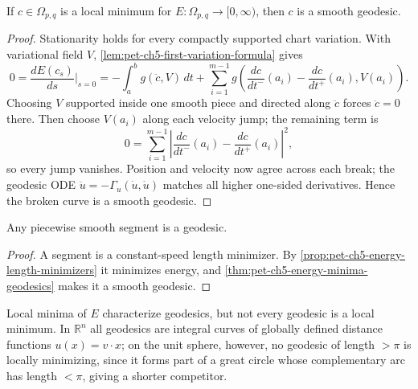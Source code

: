 \begin{theorem}
  \label{thm:pet-ch5-energy-minima-geodesics}


  If $c\in\Omega_{p,q}$ is a local minimum for $E:\Omega_{p,q}\to[0,\infty)$, then
  $c$ is a smooth geodesic.
\end{theorem}
\begin{proof}

  \sketch
  Stationarity holds for every compactly supported chart variation.  With
  variational field $V$, \cref{lem:pet-ch5-first-variation-formula} gives
  \[
    0=\frac{dE(c_s)}{ds}\Big|_{s=0}
    =-\int_a^bg(\ddot c,V)\,dt+\sum_{i=1}^{m-1}g\!\left(\frac{dc}{dt^-}(a_i)-\frac{dc}{dt^+}(a_i),V(a_i)\right).
  \]
  Choosing $V$ supported inside one smooth piece and directed along $\ddot c$
  forces $\ddot c=0$ there.  Then choose $V(a_i)$ along each velocity jump; the
  remaining term is
  \[
    0=\sum_{i=1}^{m-1}\left|\frac{dc}{dt^-}(a_i)-\frac{dc}{dt^+}(a_i)\right|^2,
  \]
  so every jump vanishes.  Position and velocity now agree across each break; the
  geodesic ODE $\ddot u=-\Gamma_u(\dot u,\dot u)$ matches all higher one-sided
  derivatives.  Hence the broken curve is a smooth geodesic.
\end{proof}

\begin{corollary}
  \label{cor:pet-ch5-segments-are-geodesics}


  Any piecewise smooth segment is a geodesic.
\end{corollary}
\begin{proof}

  \sketch
  A segment is a constant-speed length minimizer.  By
  \cref{prop:pet-ch5-energy-length-minimizers} it minimizes energy, and
  \cref{thm:pet-ch5-energy-minima-geodesics} makes it a smooth geodesic.
\end{proof}

\begin{remark}
  \label{rem:pet-ch5-sphere-not-locally-minimizing}

  Local minima of $E$ characterize geodesics, but not every geodesic is a local
  minimum. In $\mathbb R^n$ all geodesics are integral curves of globally defined
  distance functions $u(x)=v\cdot x$; on the unit sphere, however, no geodesic of
  length $>\pi$ is locally minimizing, since it forms part of a great circle whose
  complementary arc has length $<\pi$, giving a shorter competitor.
\end{remark}

